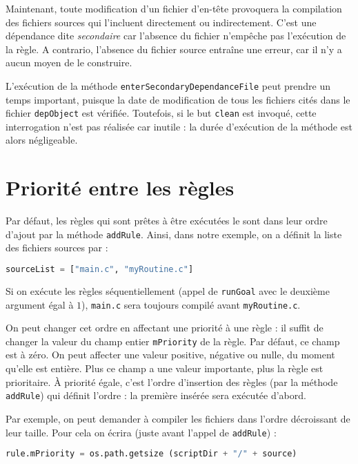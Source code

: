 \documentclass[a4paper,11pt]{extarticle}
\begin{document}
Maintenant, toute modification d'un fichier d'en-tête provoquera la compilation des fichiers sources qui l'incluent directement ou indirectement. C'est une dépendance dite \emph{secondaire} car l'absence du fichier n'empêche pas l'exécution de la règle. A contrario, l'absence du fichier source entraîne une erreur, car il n'y a aucun moyen de le construire.

L'exécution de la méthode \texttt{enterSecondaryDependanceFile} peut prendre un temps important, puisque la date de modification de tous les fichiers cités dans le fichier \texttt{depObject} est vérifiée. Toutefois, si le but \texttt{clean} est invoqué, cette interrogation n'est pas réalisée car inutile : la durée d'exécution de la méthode est alors négligeable.






\section{Priorité entre les règles}

Par défaut, les règles qui sont prêtes à être exécutées le sont dans leur ordre d'ajout par la méthode \texttt{addRule}. Ainsi, dans notre exemple, on a définit la liste des fichiers sources par :
\begin{lstlisting}[language=py]
sourceList = ["main.c", "myRoutine.c"]
\end{lstlisting}
Si on exécute les règles séquentiellement (appel de \texttt{runGoal} avec le deuxième argument égal à $1$), \texttt{main.c} sera toujours compilé avant \texttt{myRoutine.c}.

On peut changer cet ordre en affectant une priorité à une règle : il suffit de changer la valeur du champ entier \texttt{mPriority} de la règle. Par défaut, ce champ est à zéro. On peut affecter une valeur positive, négative ou nulle, du moment qu'elle est entière. Plus ce champ a une valeur importante, plus la règle est prioritaire. À priorité égale, c'est l'ordre d'insertion des règles (par la méthode \texttt{addRule}) qui définit l'ordre : la première insérée sera exécutée d'abord.

Par exemple, on peut demander à compiler les fichiers dans l'ordre décroissant de leur taille. Pour cela on écrira (juste avant l'appel de \texttt{addRule}) :
\begin{lstlisting}[language=py]
  rule.mPriority = os.path.getsize (scriptDir + "/" + source)
\end{lstlisting}
\end{document}
